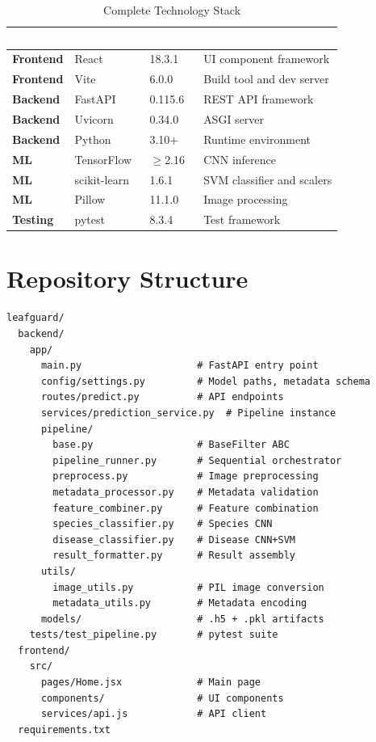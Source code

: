 \documentclass[11pt,a4paper,oneside]{report}
\begin{document}
\begin{table}[H]
\centering\footnotesize
\caption{Complete Technology Stack}
\label{tab:tech-stack}
\begin{tabularx}{\textwidth}{>{\bfseries}l l l X}
\toprule
\rowcolor{tableheader}
\textcolor{white}{Layer} & \textcolor{white}{Technology} & \textcolor{white}{Version} & \textcolor{white}{Purpose} \\
\midrule
Frontend    & React      & 18.3.1  & UI component framework \\
Frontend    & Vite       & 6.0.0   & Build tool and dev server \\
Backend     & FastAPI    & 0.115.6 & REST API framework \\
Backend     & Uvicorn    & 0.34.0  & ASGI server \\
Backend     & Python     & 3.10+   & Runtime environment \\
ML          & TensorFlow & $\geq$2.16 & CNN inference \\
ML          & scikit-learn & 1.6.1 & SVM classifier and scalers \\
ML          & Pillow     & 11.1.0  & Image processing \\
Testing     & pytest     & 8.3.4   & Test framework \\
\bottomrule
\end{tabularx}
\end{table}

\section{Repository Structure}

\begin{lstlisting}[caption={Repository Structure}, label={lst:repo-structure}]
leafguard/
  backend/
    app/
      main.py                    # FastAPI entry point
      config/settings.py         # Model paths, metadata schema
      routes/predict.py          # API endpoints
      services/prediction_service.py  # Pipeline instance
      pipeline/
        base.py                  # BaseFilter ABC
        pipeline_runner.py       # Sequential orchestrator
        preprocess.py            # Image preprocessing
        metadata_processor.py    # Metadata validation
        feature_combiner.py      # Feature combination
        species_classifier.py    # Species CNN
        disease_classifier.py    # Disease CNN+SVM
        result_formatter.py      # Result assembly
      utils/
        image_utils.py           # PIL image conversion
        metadata_utils.py        # Metadata encoding
      models/                    # .h5 + .pkl artifacts
    tests/test_pipeline.py       # pytest suite
  frontend/
    src/
      pages/Home.jsx             # Main page
      components/                # UI components
      services/api.js            # API client
  requirements.txt
\end{lstlisting}
\end{document}
